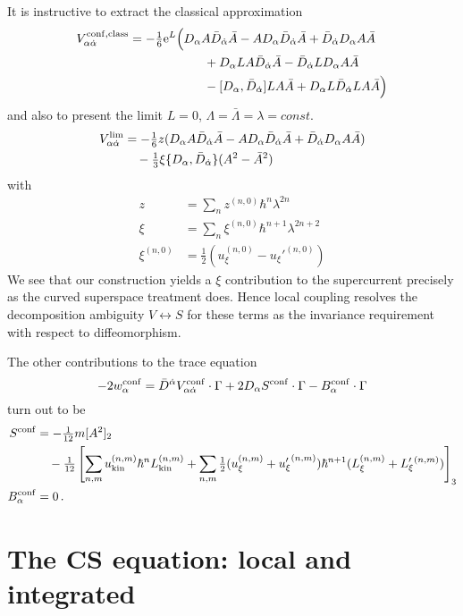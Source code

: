 \documentclass[a4paper,12pt]{article}
\newcommand{\e}{{\rm e}}
\newcommand{\half}{{\textstyle \frac{1}{2}}}
\newcommand{\Lkin}{L_{\rm kin}}
\newcommand{\Lxi}{L_{\xi}}
\newcommand{\Lxib}{L_{\xi}'{}}
\newcommand{\ukin}{u_{\rm kin}}
\newcommand{\uxi}{u_{\xi}}
\newcommand{\uxib}{{u_{\xi}'}}
\newcommand{\al}{\alpha}
\newcommand{\da}{{\dot\alpha}}
\newcommand{\tfr}[2]{{\textstyle \frac{#1}{#2}}}
\begin{document}
It is instructive to extract the classical approximation
\begin{align}
V_{\al\da}^{\rm conf, class} &= -\tfr{1}{6} \e^L\Bigl(
D_\al A \bar D_\da \bar A - A D_\al \bar D_\da \bar A + \bar D_\da D_\al A
\bar A \nonumber \\
& \qquad \qquad \qquad
+ D_\al L A \bar D_\da \bar A - \bar D_\da L D_\al A \bar A
\nonumber \\
& \qquad \qquad \qquad
-  [D_\al, \bar D_\da] L A\bar A +  D_\al L \bar D_\da L A \bar A \Bigr)
\end{align}
and also to present the limit $L=0$, $\Lambda=\bar \Lambda=\lambda=const$.
\begin{align}
V_{\al\da}^{\rm lim}&= -\tfr{1}{6} z (D_\al A \bar D_\da \bar A -A D_\al
\bar D_\da \bar A + \bar D_\da D_\al A \bar A ) \nonumber \\
& \quad -\tfr{1}{3} \xi \{D_\al, \bar D_\da \} (A^2-\bar A^2)
\end{align}
with
\begin{align}
z &= \sum_n z^{(n,0)} \hbar^n \lambda^{2n}\\
\xi &= \sum_n \xi^{(n,0)} \hbar^{n+1} \lambda^{2n+2} \\
\xi^{(n,0)} &= \half (\uxi^{(n,0)} - \uxib^{(n,0)})
\end{align}
We see that our construction yields a $\xi$ contribution to the
supercurrent precisely as the curved superspace treatment \cite{ERS1}
does. Hence local coupling resolves the decomposition ambiguity $V
\leftrightarrow S$ for these terms as the invariance requirement with
respect to diffeomorphism.          

The other contributions to the trace equation
\begin{equation}
-2 w_\al^{\rm conf} = \bar D^\da V_{\al\da}^{\rm conf} \cdot \Gamma + 2
 D_\al S^{\rm conf} \cdot \Gamma - B_\al^{\rm conf} \cdot \Gamma
\label{traceeq}
\end{equation}
turn out to be
\begin{align}
S^{\rm conf} &= -\tfr{1}{12} m [A^2]_2 \nonumber\\
& \quad -\tfr{1}{12} \left[ \sum_{n,m} \ukin^{(n,m)} \hbar^n \Lkin^{(n,m)}
  + \sum_{n,m} \half (\uxi^{(n,m)} + \uxib^{(n,m)}) \hbar^{n+1}
  (\Lxi^{(n,m)} + \Lxib^{(n,m)}) \right]_3\\
B_\al^{\rm conf} &=0\,.
\end{align}




\section{The CS equation: local and integrated}
\setcounter{equation}{0}
\end{document}
